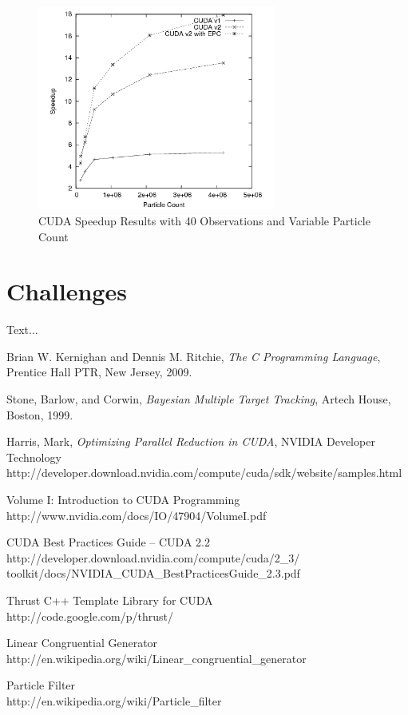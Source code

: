 \documentclass{article}
\begin{document}
\begin{figure}
\centering
\includegraphics[width=0.7\textwidth]{data/timing_results_speedup.png}
\caption{CUDA Speedup Results with 40 Observations and Variable Particle Count}
\label{final_timing2}
\end{figure}

\section{Challenges}
Text...

\begin{thebibliography}{9}

  Brian W. Kernighan and Dennis M. Ritchie,
  \emph{The C Programming Language},
  Prentice Hall PTR, New Jersey,
  2009.

  Stone, Barlow, and Corwin,
  \emph{Bayesian Multiple Target Tracking},
  Artech House, Boston,
  1999.

   Harris, Mark,
   \emph{Optimizing Parallel Reduction in CUDA},
   NVIDIA Developer Technology \\
   http://developer.download.nvidia.com/compute/cuda/sdk/website/samples.html

   Volume I: Introduction to CUDA Programming \\
   http://www.nvidia.com/docs/IO/47904/VolumeI.pdf

   CUDA Best Practices Guide -- CUDA 2.2\\
   http://developer.download.nvidia.com/compute/cuda/2\_3/\\
   toolkit/docs/NVIDIA\_CUDA\_BestPracticesGuide\_2.3.pdf

   Thrust C++ Template Library for CUDA \\
   http://code.google.com/p/thrust/

   Linear Congruential Generator \\
   http://en.wikipedia.org/wiki/Linear\_congruential\_generator

   Particle Filter \\
   http://en.wikipedia.org/wiki/Particle\_filter

\end{thebibliography}
\end{document}
